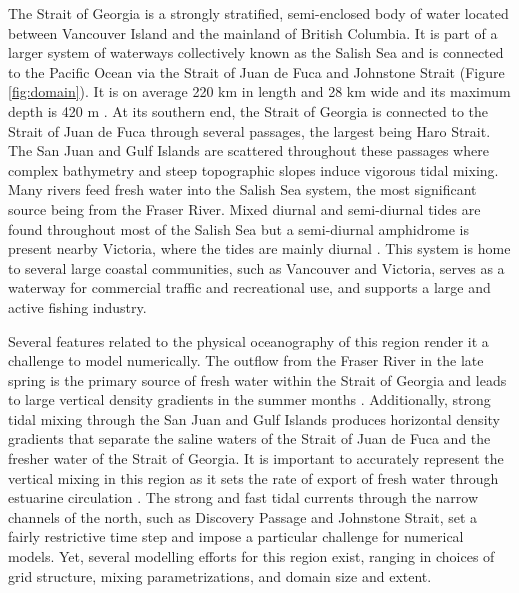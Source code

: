 \documentclass[pdftex,10pt]{article}
\begin{document}
The Strait of Georgia is a strongly stratified, semi-enclosed body of water located between Vancouver Island and the mainland of British Columbia. It is part of a larger system of waterways collectively known as the Salish Sea and is connected to the Pacific Ocean via the Strait of Juan de Fuca and Johnstone Strait (Figure \ref{fig:domain}). It is on average 220 km in length and 28 km wide and its maximum depth is 420 m \citep{thomson1981oceanography}. At its southern end, the Strait of Georgia is connected to the Strait of Juan de Fuca through several passages, the largest being Haro Strait. The San Juan and Gulf Islands are scattered throughout these passages where complex bathymetry and steep topographic slopes induce vigorous tidal mixing. Many rivers feed fresh water into the Salish Sea system, the most significant source being from the Fraser River. Mixed diurnal and semi-diurnal tides are found throughout most of the Salish Sea but a semi-diurnal amphidrome is present nearby Victoria, where the tides are mainly diurnal \citep{thomson1981oceanography}. This system is home to several large coastal communities, such as Vancouver and Victoria, serves as a waterway for commercial traffic and recreational use, and supports a large and active fishing industry.   

Several features related to the physical oceanography of this region render it a challenge to model numerically. The outflow from the Fraser River in the late spring is the primary source of fresh water within the Strait of Georgia and leads to large vertical density gradients in the summer months \citep{thomson1981oceanography}. Additionally, strong tidal mixing through the San Juan and Gulf Islands produces horizontal density gradients that separate the saline waters of the Strait of Juan de Fuca and the fresher water of the Strait of Georgia. It is important to accurately represent the vertical mixing in this region as it sets the rate of export of fresh water through estuarine circulation \citep{masson2004modelling}. The strong and fast tidal currents through the narrow channels of the north, such as Discovery Passage and Johnstone Strait, set a fairly restrictive time step and impose a particular challenge for numerical models. Yet, several modelling efforts for this region exist, ranging in choices of grid structure, mixing parametrizations, and domain size and extent. 
\end{document}
